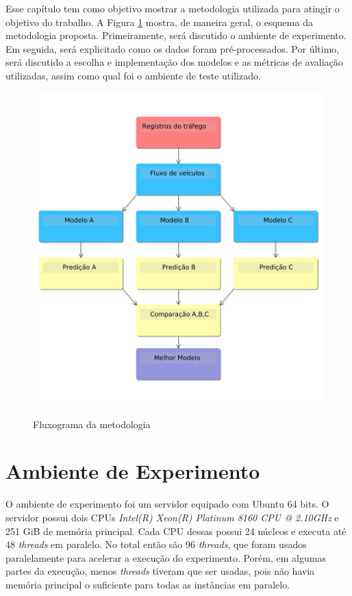 Esse capítulo tem como objetivo mostrar a metodologia utilizada para atingir o objetivo do trabalho. A Figura \ref{figure:metodologia} mostra, de maneira geral, o esquema da metodologia proposta. Primeiramente, será discutido o ambiente de experimento. Em seguida, será explicitado como os dados foram pré-processados. Por último, será discutido a escolha e implementação dos modelos e as métricas de avaliação utilizadas, assim como qual foi o ambiente de teste utilizado.

\begin{figure}
    \centering
    \includegraphics[scale=0.4]{monography/img/tccFlux.png}
    \label{figure:metodologia}
    \caption[Fluxograma da metodologia]{Fluxograma da metodologia}
\end{figure}

\section{Ambiente de Experimento}

O ambiente de experimento foi um servidor equipado com Ubuntu 64 bits. O servidor possui dois CPUs \textit{Intel(R) Xeon(R) Platinum 8160 CPU @ 2.10GHz} e 251 GiB de memória principal. Cada CPU dessas possui 24 núcleos e executa até 48 \textit{threads} em paralelo. No total então são 96 \textit{threads}, que foram usados paralelamente para acelerar a execução do experimento. Porém, em algumas partes da execução, menos \textit{threads} tiveram que ser usadas, pois não havia memória principal o suficiente para todas as instâncias em paralelo.

